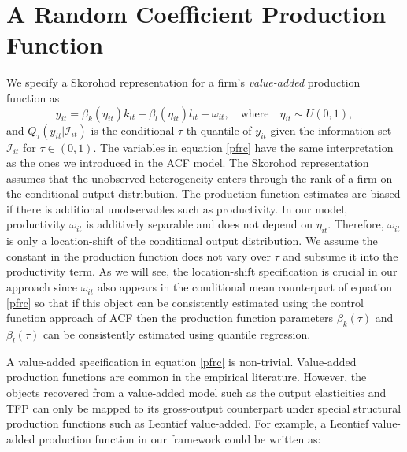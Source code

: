 \documentclass[12pt]{article}
\begin{document}
\section{A Random Coefficient Production Function} \label{ourmodel}
We specify a Skorohod representation for a firm's \textit{value-added} production function as
\begin{equation} \label{pfrc}
    y_{it}=\beta_{k}(\eta_{it})k_{it}+\beta_{l}(\eta_{it})l_{it}+\omega_{it}, \quad \text{where}\quad \eta_{it}\sim U(0,1),
\end{equation}
 and $Q_{\tau}(y_{it}|\mathcal{I}_{it})$ is the conditional $\tau$-th quantile of $y_{it}$ given the information set $\mathcal{I}_{it}$ for $\tau\in(0,1)$. The variables in equation \eqref{pfrc} have the same interpretation as the ones we introduced in the ACF model. The Skorohod representation assumes that the unobserved heterogeneity enters through the rank of a firm on the conditional output distribution. The production function estimates are biased if there is additional unobservables such as productivity. In our model, productivity $\omega_{it}$ is additively separable and does not depend on $\eta_{it}$. Therefore, $\omega_{it}$ is only a location-shift of the conditional output distribution. We assume the constant in the production function does not vary over $\tau$ and subsume it into the productivity term. As we will see, the location-shift specification is crucial in our approach since $\omega_{it}$ also appears in the conditional mean counterpart of equation \eqref{pfrc} so that if this object can be consistently estimated using the control function approach of ACF then the production function parameters $\beta_{k}(\tau)$ and $\beta_{l}(\tau)$ can be consistently estimated using quantile regression.

 A value-added specification in equation \eqref{pfrc} is non-trivial. Value-added production functions are common in the empirical literature. However, the objects recovered from a value-added model such as the output elasticities and TFP can only be mapped to its gross-output counterpart under special structural production functions such as Leontief value-added. For example, a Leontief value-added production function in our framework could be written as:
\end{document}
